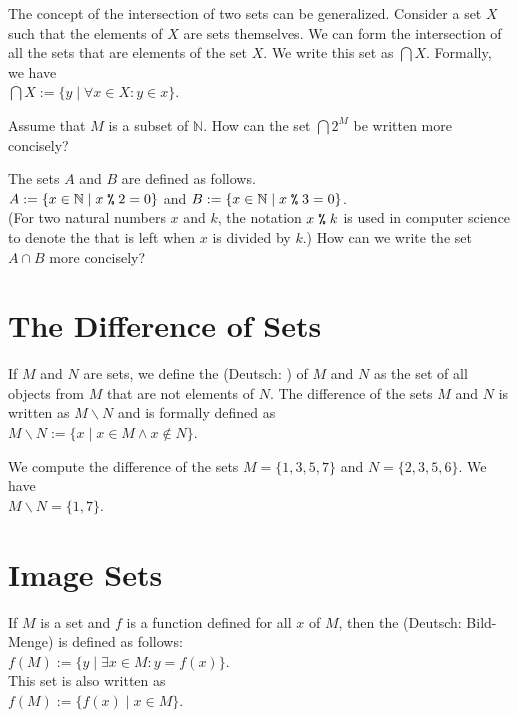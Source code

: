 The concept of the intersection of two sets can be generalized.  Consider
a set $X$ such that the elements of $X$ are sets themselves. 
We can form the intersection of all the 
sets that are elements of the set $X$.  We write this set as $\bigcap X$.  Formally,
we have
\\[0.2cm]
\hspace*{1.3cm} 
$\bigcap X := \{ y \;|\; \forall x \in X: y \in x \}$.
\vspace*{0.2cm}

\exerciseEng
Assume that $M$ is a subset of $\mathbb{N}$.  How can the set $\bigcap 2^M$ be written more concisely?
\eox

\exerciseEng
The sets $A$ and $B$ are defined as follows. 
\\[0.2cm]
\hspace*{1.3cm}
$A := \{ x \in \mathbb{N} \mid x \;\texttt{\%}\; 2 = 0 \}$ \quad and \quad
$B := \{ x \in \mathbb{N} \mid x \;\texttt{\%}\; 3 = 0 \}$.
\\[0.2cm]
(For two natural numbers $x$ and $k$, the notation $x \;\texttt{\%}\; k$ is used in computer science to denote the
 that is left when $x$ is divided by $k$.)
How can we write the set $A \cap B$ more concisely?
\eox


\section{The Difference of Sets}
If $M$ and $N$ are sets, we define the   
(Deutsch: ) 
of $M$ and $N$ as the set of all objects from $M$ that are not elements of $N$.  The difference of the sets $M$
and $N$ is written as $M\backslash N$ and is formally defined as
 \\[0.2cm]
\hspace*{1.3cm} $M \backslash N := \{ x \mid x \in M \wedge x \not\in N \}$.

\exampleEng
We compute the difference of the sets $M = \{ 1, 3, 5, 7 \}$ and $N = \{ 2, 3, 5, 6 \}$.  We have
\\[0.2cm]
\hspace*{1.3cm} $M \backslash N = \{ 1, 7 \}$. \eox

\section{Image Sets}
If $M$ is a set and $f$ is a function defined for all $x$ of $M$, then the 
(Deutsch: Bild-Menge) 
is defined as follows:
\\[0.2cm]
\hspace*{1.3cm}
$f(M) := \{ y \;|\; \exists x \in M: y = f(x) \}$. 
\\[0.2cm]
This set is also written as
\\[0.2cm]
\hspace*{1.3cm}
$f(M) := \bigl\{ f(x) \;|\; x \in M \}$. 

